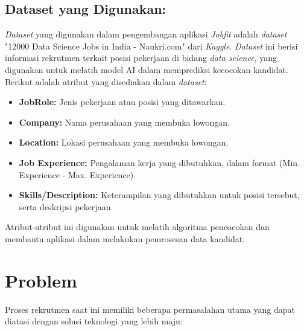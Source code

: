 \documentclass[journal,article,submit,pdftex,moreauthors]{Definitions/mdpi}
\begin{document}
\subsection{Dataset yang Digunakan:}
\textit{Dataset} yang digunakan dalam pengembangan aplikasi \textit{Jobfit} adalah \textit{dataset} "12000 Data Science Jobs in India - Naukri.com" dari \textit{Kaggle}. \textit{Dataset} ini berisi informasi rekrutmen terkait posisi pekerjaan di bidang \textit{data science}, yang digunakan untuk melatih model AI dalam memprediksi kecocokan kandidat. Berikut adalah atribut yang disediakan dalam \textit{dataset}:
\begin{itemize}[left=2em]
    \item \textbf{JobRole:}
    Jenis pekerjaan atau posisi yang ditawarkan.
    \item \textbf{Company:}
    Nama perusahaan yang membuka lowongan.
    \item \textbf{Location:}
    Lokasi perusahaan yang membuka lowongan.
    \item \textbf{Job Experience:}
    Pengalaman kerja yang dibutuhkan, dalam format (Min. Experience - Max. Experience).
    \item \textbf{Skills/Description:}
    Keterampilan yang dibutuhkan untuk posisi tersebut, serta deskripsi pekerjaan.
\end{itemize}
Atribut-atribut ini digunakan untuk melatih algoritma pencocokan dan membantu aplikasi dalam melakukan pemrosesan data kandidat.

\section{Problem}
Proses rekrutmen saat ini memiliki beberapa permasalahan utama yang dapat diatasi dengan solusi teknologi yang lebih maju:
\end{document}
